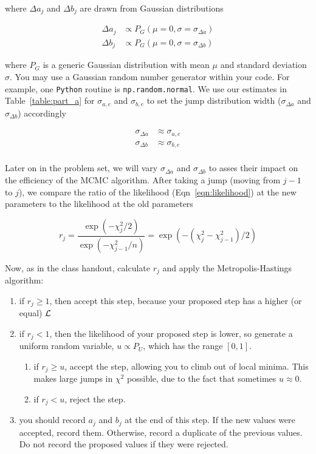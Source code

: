 \documentclass[iop,floatfix]{emulateapj}
\begin{document}
where $\Delta a_j$ and $\Delta b_j$ are drawn from Gaussian distributions

\begin{eqnarray}
  \Delta a_j &\propto P_G(\mu = 0, \sigma = \sigma_{\Delta a})\\
  \Delta b_j &\propto P_G(\mu = 0, \sigma = \sigma_{\Delta b})
\end{eqnarray}

where $P_G$ is a generic Gaussian distribution with mean $\mu$ and standard deviation $\sigma$. You may use a Gaussian random number generator within your code. For example, one \verb|Python| routine is \verb|np.random.normal|. We use our estimates in Table~\ref{table:part_a} for $\sigma_{a,e}$ and $\sigma_{b,e}$ to set the jump distribution width ($\sigma_{\Delta a}$ and $\sigma_{\Delta b}$) accordingly

\begin{eqnarray}
  \sigma_{\Delta a} &\approx \sigma_{a,e}\\
  \sigma_{\Delta b} &\approx \sigma_{b,e}\\
\end{eqnarray}

Later on in the problem set, we will vary $\sigma_{\Delta a}$ and $\sigma_{\Delta b}$ to asses their impact on the efficiency of the MCMC algorithm. After taking a jump (moving from $j -1 $ to $j$), we compare the ratio of the likelihood (Eqn~\ref{eqn:likelihood}) at the new parameters to the likelihood at the old parameters

\begin{equation}
  r_j = \frac{\exp(-\chi_j^2 / 2)}{\exp(-\chi_{j-1}^2/n)} = \exp(-(\chi^2_j - \chi^2_{j-1})/2)
\end{equation}

Now, as in the class handout, calculate $r_j$ and apply the Metropolis-Hastings algorithm:
\begin{enumerate}
  \item if $r_j \geq 1$, then accept this step, because your proposed step has a higher (or equal) ${\cal L}$
  \item if $r_j < 1$, then the likelihood of your proposed step is lower, so generate a uniform random variable, $u \propto P_U$, which has the range $[0,1]$.
    \begin{enumerate}
      \item if $r_j \geq u$, accept the step, allowing you to climb out of local minima. This makes large jumps in $\chi^2$ possible, due to the fact that sometimes $u \approx 0$.
      \item if $r_j < u$, reject the step. 
    \end{enumerate}
  \item you should record $a_j$ and $b_j$ at the end of this step. If the new values were accepted, record them. Otherwise, record a duplicate of the previous values. Do not record the proposed values if they were rejected.
\end{enumerate}
\end{document}
